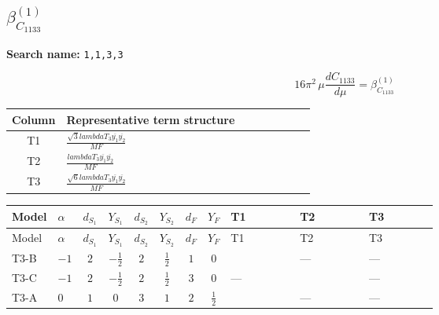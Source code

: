 \documentclass[8pt]{article}
\begin{document}
\begin{landscape}
\section*{$\beta_{C_{1133}}^{(1)}$}
\noindent\textbf{Search name: }\texttt{1,1,3,3}\par\smallskip
\[16\pi^2\,\mu\frac{d C_{1133}}{d\mu}=\beta_{C_{1133}}^{(1)}\]
\begin{center}
\begin{tabular}{@{}c >{\raggedright\arraybackslash}p{0.82\linewidth}@{}}
\toprule
Column & Representative term structure \\
\midrule
T1 & \(\displaystyle \frac{\sqrt{3} lambdaT_{3} \overline{y_{1}} \overline{y_{2}}}{MF}\) \\
\midrule
T2 & \(\displaystyle \frac{lambdaT_{3} \overline{y_{1}} \overline{y_{2}}}{MF}\) \\
\midrule
T3 & \(\displaystyle \frac{\sqrt{6} lambdaT_{3} \overline{y_{1}} \overline{y_{2}}}{MF}\) \\
\midrule
\bottomrule
\end{tabular}
\end{center}
\smallskip
\tiny
\begin{longtable}{@{}llcccccc >{\raggedright\arraybackslash}p{0.21\linewidth} >{\raggedright\arraybackslash}p{0.21\linewidth} >{\raggedright\arraybackslash}p{0.21\linewidth}@{}}
\toprule
Model & $\alpha$ & $d_{S_1}$ & $Y_{S_1}$ & $d_{S_2}$ & $Y_{S_2}$ & $d_F$ & $Y_F$ & T1 & T2 & T3 \\
\midrule
\endfirsthead
\toprule
Model & $\alpha$ & $d_{S_1}$ & $Y_{S_1}$ & $d_{S_2}$ & $Y_{S_2}$ & $d_F$ & $Y_F$ & T1 & T2 & T3 \\
\midrule
\endhead
T3-B & $-1$ & $2$ & $-\frac{1}{2}$ & $2$ & $\frac{1}{2}$ & $1$ & $0$ & \scriptsize\adjustbox{max width=\linewidth}{$\begin{gathered} \frac{2 \sqrt{3} lambdaT_{3} \overline{y_{1}} \overline{y_{2}}}{3 MF}\end{gathered}$} & --- & --- \\
\midrule
T3-C & $-1$ & $2$ & $-\frac{1}{2}$ & $2$ & $\frac{1}{2}$ & $3$ & $0$ & --- & \scriptsize\adjustbox{max width=\linewidth}{$\begin{gathered} - \frac{2 lambdaT_{3} \overline{y_{1}} \overline{y_{2}}}{3 MF}\end{gathered}$} & --- \\
\midrule
T3-A & $0$ & $1$ & $0$ & $3$ & $1$ & $2$ & $\frac{1}{2}$ & \scriptsize\adjustbox{max width=\linewidth}{$\begin{gathered} \frac{2 \sqrt{3} lambdaT_{3} \overline{y_{1}} \overline{y_{2}}}{3 MF}\end{gathered}$} & --- & --- \\

\end{longtable}
\end{landscape}
\end{document}

